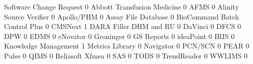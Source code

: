 \documentclass{article}
\begin{document}
\begin{Schunk}
\begin{Soutput}
                                Software Change Request
                                                      0
  Abbott Transfusion Medicine                         0
  AFMS                                                0
  Alinity Source Verifier                             0
  Apollo/PHM                                          0
  Assay File Database                                 0
  BioCommand Batch Control Plus                       0
  CMSNext                                             1
  DARA Filler DHM and RU                              0
  DaVinci                                             0
  DFCS                                                0
  DPW                                                 0
  EDMS                                                0
  eNovator                                            0
  Groninger                                           0
  GS Reports                                          0
  ideaPoint                                           0
  IRIS                                                0
  Knowledge Management                                1
  Metrics Library                                     0
  Navigator                                           0
  PCN/SCN                                             0
  PEAR                                                0
  Pulse                                               0
  QIMS                                                0
  Reliasoft Xfmea                                     0
  SAS                                                 0
  TODS                                                0
  TrendReader                                         0
  WWLIMS                                              0
                               

\end{Soutput}
\end{Schunk}
\end{document}
